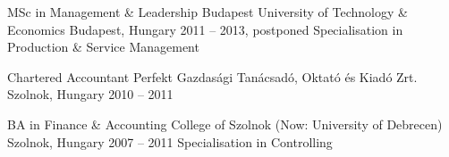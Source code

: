 


\begin{cventries}


  \cventry
    {MSc in Management \& Leadership} %
    {Budapest University of Technology \& Economics} %
    {Budapest, Hungary} %
    {2011 -- 2013, postponed} %
    {Specialisation in Production \& Service Management} %
    {} %


  \cventry
    {Chartered Accountant} %
    {Perfekt Gazdasági Tanácsadó, Oktató és Kiadó Zrt.} %
    {Szolnok, Hungary} %
    {2010 -- 2011} %
    {} %
    {} %


  \cventry
    {BA in Finance \& Accounting} %
    {College of Szolnok (Now: University of Debrecen)} %
    {Szolnok, Hungary} %
    {2007 -- 2011} %
    {Specialisation in Controlling} %
    {} %
    

\end{cventries}
